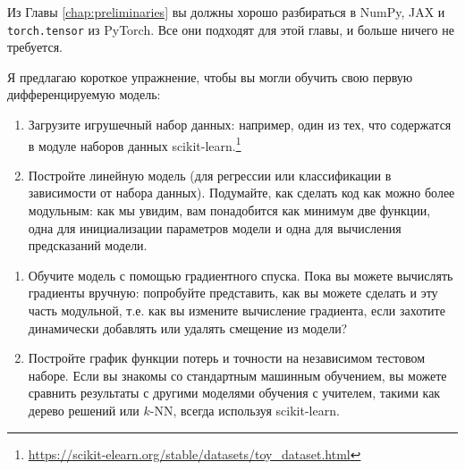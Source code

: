 Из Главы \ref{chap:preliminaries} вы должны хорошо разбираться в NumPy, JAX и \texttt{torch.tensor} из PyTorch. Все они подходят для этой главы, и больше ничего не требуется.

Я предлагаю короткое упражнение, чтобы вы могли обучить свою первую дифференцируемую модель:

\begin{enumerate}
\item Загрузите игрушечный набор данных: например, один из тех, что содержатся в модуле наборов данных scikit-learn.\footnote{\url{https://scikit-elearn.org/stable/datasets/toy_dataset.html}}
\item Постройте линейную модель (для регрессии или классификации в зависимости от набора данных). Подумайте, как сделать код как можно более модульным: как мы увидим, вам понадобится как минимум две функции, одна для инициализации параметров модели и одна для вычисления предсказаний модели.
\end{enumerate}

\begin{enumerate}\addtocounter{enumi}{2}
\item Обучите модель с помощью градиентного спуска. Пока вы можете вычислять градиенты вручную: попробуйте представить, как вы можете сделать и эту часть модульной, т.е. как вы измените вычисление градиента, если захотите динамически добавлять или удалять смещение из модели?
\item Постройте график функции потерь и точности на независимом тестовом наборе. Если вы знакомы со стандартным машинным обучением, вы можете сравнить результаты с другими моделями обучения с учителем, такими как дерево решений или $k$-NN, всегда используя scikit-learn.
\end{enumerate}
